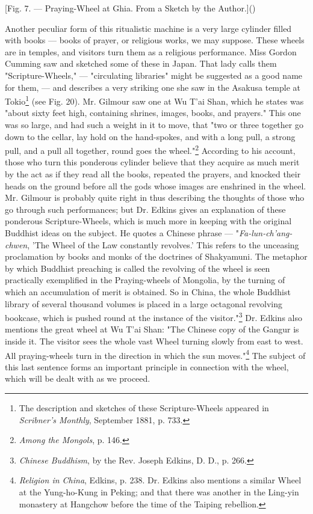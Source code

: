 \documentclass[a4paper, 11pt, oneside, polutonikogreek, english]{article}
\begin{document}
[Fig. 7. --- Praying-Wheel at Ghia. From a Sketch by the Author.]()

Another peculiar form of this ritualistic machine is a very large cylinder filled with books --- books of prayer, or religious works, we may suppose. These wheels are in temples, and visitors turn them as a religious performance. Miss Gordon Cumming saw and sketched some of these in Japan. That lady calls them "Scripture-Wheels," --- "circulating libraries" might be suggested as a good name for them, --- and describes a very striking one she saw in the Asakusa temple at Tokio\footnote{The description and sketches of these Scripture-Wheels appeared in \emph{Scribner's Monthly}, September 1881, p. 733.} (see Fig. 20). Mr. Gilmour saw one at Wu T'ai Shan, which he states was "about sixty feet high, containing shrines, images, books, and prayers." This one was so large, and had such a weight in it to move, that "two or three together go down to the cellar, lay hold on the hand-spokes, and with a long pull, a strong pull, and a pull all together, round goes the wheel."\footnote{\emph{Among the Mongols}, p. 146.} According to his account, those who turn this ponderous cylinder believe that they acquire as much merit by the act as if they read all the books, repeated the prayers, and knocked their heads on the ground before all the gods whose images are enshrined in the wheel. Mr. Gilmour is probably quite right in thus describing the thoughts of those who go through such performances; but Dr. Edkins gives an explanation of these ponderous Scripture-Wheels, which is much more in keeping with the original Buddhist ideas on the subject. He quotes a Chinese phrase --- "\emph{Fa-lun-ch'ang-chwen}, 'The Wheel of the Law constantly revolves.' This refers to the unceasing proclamation by books and monks of the doctrines of Shakyamuni. The metaphor by which Buddhist preaching is called the revolving of the wheel is seen practically exemplified in the Praying-wheels of Mongolia, by the turning of which an accumulation of merit is obtained. So in China, the whole Buddhist library of several thousand volumes is placed in a large octagonal revolving bookcase, which is pushed round at the instance of the visitor."\footnote{\emph{Chinese Buddhism}, by the Rev. Joseph Edkins, D. D., p. 266.} Dr. Edkins also mentions the great wheel at Wu T'ai Shan: "The Chinese copy of the Gangur is inside it. The visitor sees the whole vast Wheel turning slowly from east to west. All praying-wheels turn in the direction in which the sun moves."\footnote{\emph{Religion in China}, Edkins, p. 238. Dr. Edkins also mentions a similar Wheel at the Yung-ho-Kung in Peking; and that there was another in the Ling-yin monastery at Hangchow before the time of the Taiping rebellion.} The subject of this last sentence forms an important principle in connection with the wheel, which will be dealt with as we proceed.
\end{document}
